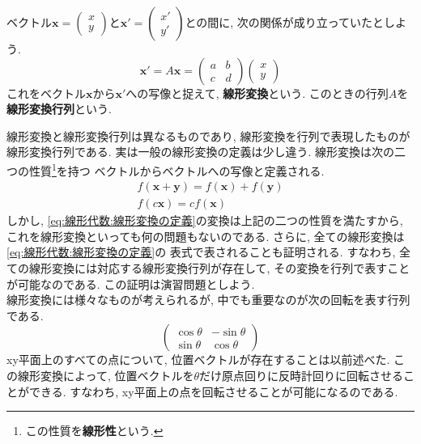 \documentclass[a4j,dvipdfmx]{jsarticle}
\numberwithin{equation}{section}
\begin{document}
            ベクトル$\bm{x}=\begin{pmatrix}x\\y\end{pmatrix}$と$\bm{x}'=\begin{pmatrix}x'\\y'\end{pmatrix}$との間に, 次の関係が成り立っていたとしよう.
            \begin{equation}
                \bm{x}'=A\bm{x}=\begin{pmatrix}a & b \\ c& d\end{pmatrix}\begin{pmatrix}x\\y\end{pmatrix} \label{eq:線形代数:線形変換の定義}
            \end{equation}
            これをベクトル$\bm{x}$から$\bm{x}'$への写像と捉えて, \textbf{線形変換}という. このときの行列$A$を\textbf{線形変換行列}という.

            線形変換と線形変換行列は異なるものであり, 線形変換を行列で表現したものが線形変換行列である. 実は一般の線形変換の定義は少し違う. 線形変換は次の二つの性質\footnote{この性質を\textbf{線形性}という.}を持つ
            ベクトルからベクトルへの写像と定義される.
            \begin{align}
                f(\bm{x}+\bm{y})=f(\bm{x})+f(\bm{y}) \label{eq:線形代数:線形変換の条件1}\\
                f(c\bm{x})=cf(\bm{x}) \label{eq:線形代数:線形変換の条件2}
            \end{align}
            しかし, \eqref{eq:線形代数:線形変換の定義}の変換は上記の二つの性質を満たすから, これを線形変換といっても何の問題もないのである. さらに, 全ての線形変換は\eqref{eq:線形代数:線形変換の定義}の
            表式で表されることも証明される. すなわち, 全ての線形変換には対応する線形変換行列が存在して, その変換を行列で表すことが可能なのである. この証明は演習問題としよう.\\

            線形変換には様々なものが考えられるが, 中でも重要なのが次の回転を表す行列である.
            \begin{equation}
                \begin{pmatrix}
                    \cos\theta & -\sin\theta \\
                    \sin\theta & \cos\theta
                \end{pmatrix}\label{eq:線形代数:回転行列}
            \end{equation}
            xy平面上のすべての点について, 位置ベクトルが存在することは以前述べた. この線形変換によって, 位置ベクトルを$\theta$だけ原点回りに反時計回りに回転させることができる.
            すなわち, xy平面上の点を回転させることが可能になるのである. 
\end{document}
